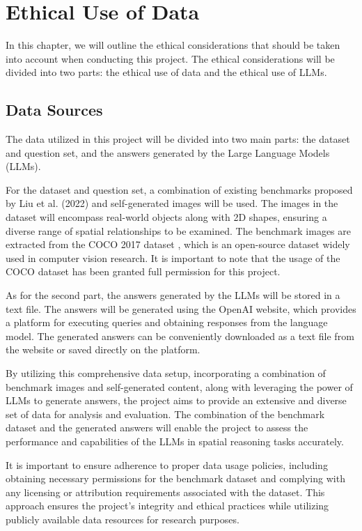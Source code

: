 \documentclass[twocolumn,11pt]{report}
\begin{document}

\chapter{Ethical Use of Data}\label{chap:ethics}

In this chapter, we will outline the ethical considerations that should be taken into account when conducting this project. The ethical considerations will be divided into two parts: the ethical use of data and the ethical use of LLMs.

\section{Data Sources}
The data utilized in this project will be divided into two main parts: the dataset and question set, and the answers generated by the Large Language Models (LLMs).

For the dataset and question set, a combination of existing benchmarks proposed by Liu et al. (2022) \cite{liu2022visual} and self-generated images will be used. The images in the dataset will encompass real-world objects along with 2D shapes, ensuring a diverse range of spatial relationships to be examined. The benchmark images are extracted from the COCO 2017 dataset \cite{lin2014microsoft}, which is an open-source dataset widely used in computer vision research. It is important to note that the usage of the COCO dataset has been granted full permission for this project.

As for the second part, the answers generated by the LLMs will be stored in a text file. The answers will be generated using the OpenAI website, which provides a platform for executing queries and obtaining responses from the language model. The generated answers can be conveniently downloaded as a text file from the website or saved directly on the platform.

By utilizing this comprehensive data setup, incorporating a combination of benchmark images and self-generated content, along with leveraging the power of LLMs to generate answers, the project aims to provide an extensive and diverse set of data for analysis and evaluation. The combination of the benchmark dataset and the generated answers will enable the project to assess the performance and capabilities of the LLMs in spatial reasoning tasks accurately.

It is important to ensure adherence to proper data usage policies, including obtaining necessary permissions for the benchmark dataset and complying with any licensing or attribution requirements associated with the dataset. This approach ensures the project's integrity and ethical practices while utilizing publicly available data resources for research purposes.\\
\end{document}
